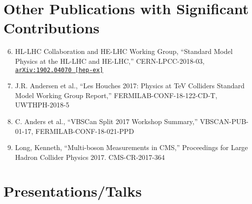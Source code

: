 \documentclass[10pt]{res} %
\begin{document}
\begin{resume}
\section{Other Publications with Significant Contributions}
\begin{enumerate}
  \setcounter{enumi}{5}
  \item HL-LHC Collaboration and HE-LHC Working Group, ``Standard Model Physics at the HL-LHC and HE-LHC,''
    CERN-LPCC-2018-03, \href{https://arxiv.org/abs/1902.04070} {\texttt{arXiv:1902.04070 [hep-ex]}}
  \item J.R. Andersen et al., ``Les Houches 2017: Physics at TeV Colliders Standard Model Working Group Report,''
    FERMILAB-CONF-18-122-CD-T, UWTHPH-2018-5
  \item C. Anders et al., ``VBSCan Split 2017 Workshop Summary,'' 
    VBSCAN-PUB-01-17, FERMILAB-CONF-18-021-PPD
  \item Long, Kenneth, ``Multi-boson Measurements in CMS,''
    Proceedings for Large Hadron Collider Physics 2017. CMS-CR-2017-364
\end{enumerate}

\section{Presentations/Talks}
\vspace{-0.1in}


\end{resume}
\end{document}
